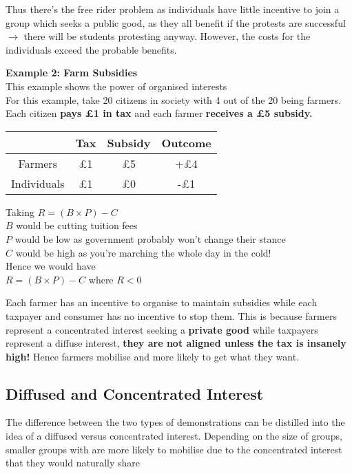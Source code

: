 \documentclass[12pt, letterpaper]{article}
\begin{document}
Thus there's the free rider problem as individuals have little incentive to join a group which seeks a public good, as they all benefit if the protests are successful $\rightarrow$ there will be students protesting anyway. However, the costs for the individuals exceed the probable benefits.

\begin{center}
\textbf{Example 2: Farm Subsidies} \\
This example shows the power of organised interests \\
For this example, take 20 citizens in society with 4 out of the 20 being farmers. Each citizen \textbf{pays £1 in tax} and each farmer \textbf{receives a £5 subsidy.}

\begin{center}
\begin{tabular}{|c|c|c|c|}

	\hline
	& Tax & Subsidy & Outcome \\
	\hline
	\hline
	Farmers & £1 & £5 & +£4 \\
	\hline
	Individuals & £1 & £0 & -£1 \\
	\hline

\end{tabular}
\end{center}

Taking $R=(B \times P) - C$ \\
$B$ would be cutting tuition fees \\
$P$ would be low as government probably won't change their stance \\
$C$ would be high as you're marching the whole day in the cold! \\
Hence we would have \\
$R=(B \times P) - C$ where $R<0$
\end{center}

Each farmer has an incentive to organise to maintain subsidies while each taxpayer and consumer has no incentive to stop them. This is because farmers represent a concentrated interest seeking a \textbf{private good} while taxpayers represent a diffuse interest, \textbf{they are not aligned unless the tax is insanely high!} Hence farmers mobilise and more likely to get what they want.

\subsection{Diffused and Concentrated Interest}
The difference between the two types of demonstrations can be distilled into the idea of a diffused versus concentrated interest. Depending on the size of groups, smaller groups with are more likely to mobilise due to the concentrated interest that they would naturally share
\end{document}
